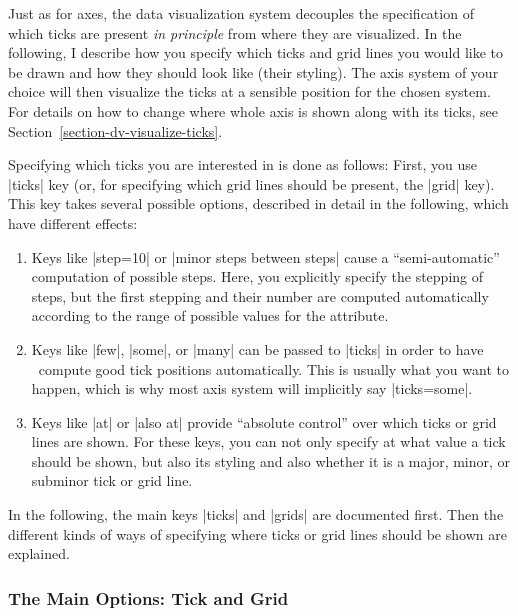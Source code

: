 Just as for axes, the data visualization system decouples the specification of
which ticks are present \emph{in principle} from where they are visualized. In
the following, I describe how you specify which ticks and grid lines you would
like to be drawn and how they should look like (their styling). The axis system
of your choice will then visualize the ticks at a sensible position for the
chosen system. For details on how to change where whole axis is shown along
with its ticks, see Section~\ref{section-dv-visualize-ticks}.

Specifying which ticks you are interested in is done as follows: First, you use
|ticks| key (or, for specifying which grid lines should be present, the |grid|
key). This key takes several possible options, described in detail in the
following, which have different effects:
%
\begin{enumerate}
    \item Keys like |step=10| or |minor steps between steps| cause a
        ``semi-automatic'' computation of possible steps. Here, you explicitly
        specify the stepping of steps, but the first stepping and their number
        are computed automatically according to the range of possible values
        for the attribute.
    \item Keys like |few|, |some|, or |many| can be passed to |ticks| in order
        to have \tikzname\ compute good tick positions automatically. This is
        usually what you want to happen, which is why most axis system will
        implicitly say |ticks={some}|.
    \item Keys like |at| or |also at| provide ``absolute control'' over which
        ticks or grid lines are shown. For these keys, you can not only specify
        at what value a tick should be shown, but also its styling and also
        whether it is a major, minor, or subminor tick or grid line.
\end{enumerate}

In the following, the main keys |ticks| and |grids| are documented first. Then
the different kinds of ways of specifying where ticks or grid lines should be
shown are explained.


\subsubsection{The Main Options: Tick and Grid}

